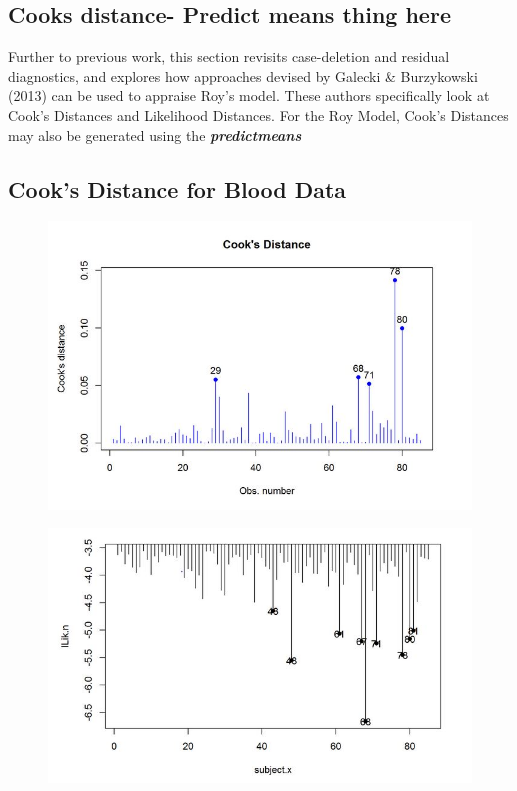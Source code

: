 \documentclass[12pt, a4paper]{report}
\theoremstyle{plain}
\theoremstyle{definition}
\theoremstyle{remark}
\begin{document}
\subsection{Cooks distance- Predict means thing here}

Further to previous work, this section revisits case-deletion and residual diagnostics, and explores how approaches devised by  Galecki \& Burzykowski (2013) can be used to appraise Roy's model. These authors specifically look at Cook's Distances and Likelihood Distances.
For the Roy Model, Cook's Distances may also be generated using the \textbf{\textit{predictmeans}}

\subsection{Cook's Distance for Blood Data}



\begin{figure}[h!]
	\centering
	\includegraphics[width=0.7\linewidth]{images/CooksDistancePlot-JS-Roy}
	\caption{}
	\label{fig:CooksDistancePlot-JS-Roy}
\end{figure}

\begin{figure}[h!]
	\centering
	\includegraphics[width=0.7\linewidth]{images/LogLik-JS-Roy}
	\caption{}
	\label{fig:LogLik-JS-Roy}
\end{figure}
\end{document}
